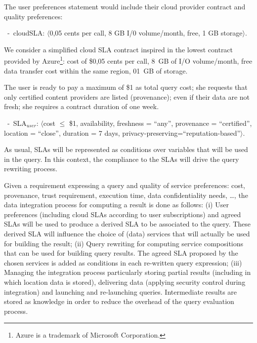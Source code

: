The user preferences statement would include their cloud provider contract and quality preferences:
\begin{trivlist}\sf\footnotesize
\item[~-~cloudSLA:]  $\langle$0,05 cents per call, 8 GB I/0 volume/month, free, 1 GB storage$\rangle$. 
\end{trivlist}

We consider a simplified cloud SLA contract inspired in the lowest contract provided by Azure\footnote{Azure is a trademark of Microsoft Corporation.}: {\sf cost of \$0,05 cents per call,  8~GB of I/O volume/month, free data transfer cost within the same region,  01~GB of storage}. 

The user is ready to pay a maximum of {\sf \$1 as total query cost}; she requests that only {\sf certified} content providers are listed (provenance); even if their data are not fresh; she requires a contract duration of one week.

\begin{trivlist}\sf\footnotesize
\item[~-~SLA$_\mathit{user}$: ] $\langle$cost $\leq$ \$1, availability, freshness = ``any'', provenance = ``certified'', location = ``close'', duration = 7 days, privacy-preserving=``reputation-based''$\rangle$. 
\end{trivlist}

As usual, SLAs will be represented as conditions over variables that will be used in the query.
In this context, the compliance to the SLAs will drive the query rewriting process.


Given a requirement expressing a query and quality of service preferences: cost, provenance, trust requirement, execution time, data confidentiality needs, \dots, the data integration process for computing a result is done as follows: (i) User preferences (including cloud SLAs according to user subscriptions) and agreed SLAs will be used to produce a derived SLA to be associated to the query. 
These derived SLA will influence the choice of (data) services that will actually be used for building the result; (ii) Query rewriting for computing service compositions that can be used for  building query results. The agreed SLA proposed by the chosen services is added as  conditions in  each re-written   query expression; (iii) Managing the integration process particularly storing partial results (including in  which location data is stored), delivering data (applying security control during integration) and launching and re-launching queries. Intermediate results  are stored as knowledge in order to reduce the overhead of the query evaluation process. 



